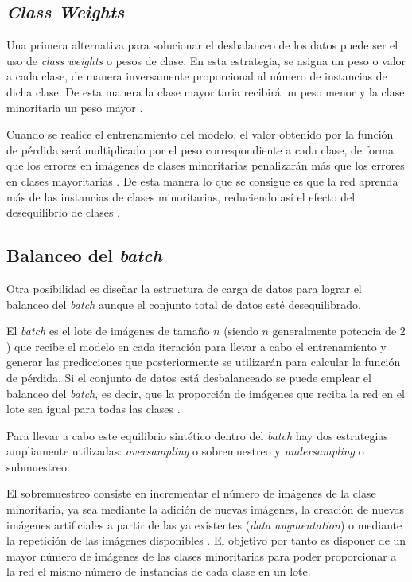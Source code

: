 \subsection{\textit{Class Weights}}

Una primera alternativa para solucionar el desbalanceo de los datos puede ser el uso de \textit{class weights} o pesos de clase. En esta estrategia, se asigna un peso o valor a cada clase, de manera inversamente proporcional al número de instancias de dicha clase. De esta manera la clase mayoritaria recibirá un peso menor y la clase minoritaria un peso mayor \cite{classw:scienced}. 

Cuando se realice el entrenamiento del modelo, el valor obtenido por la función de pérdida será multiplicado por el peso correspondiente a cada clase, de forma que los errores en imágenes de clases minoritarias penalizarán más que los errores en clases mayoritarias \cite{classw:book}. De esta manera lo que se consigue es que la red aprenda más de las instancias de clases minoritarias, reduciendo así el efecto del desequilibrio de clases \cite{classw:scienced}.

\subsection{Balanceo del \textit{batch}}

Otra posibilidad es diseñar la estructura de carga de datos para lograr el balanceo del \textit{batch} aunque el conjunto total de datos esté desequilibrado.

El \textit{batch} es el lote de imágenes de tamaño $n$ (siendo $n$ generalmente potencia de $2$) que recibe el modelo en cada iteración para llevar a cabo el entrenamiento y generar las predicciones que posteriormente se utilizarán para calcular la función de pérdida. Si el conjunto de datos está desbalanceado se puede emplear el balanceo del \textit{batch}, es decir, que la proporción de imágenes que reciba la red en el lote sea igual para todas las clases \cite{bal_batch:scihub}.

Para llevar a cabo este equilibrio sintético dentro del \textit{batch} hay dos estrategias ampliamente utilizadas: \textit{oversampling} o sobremuestreo y \textit{undersampling} o submuestreo.

El sobremuestreo consiste en incrementar el número de imágenes de la clase minoritaria, ya sea mediante la adición de nuevas imágenes, la creación de nuevas imágenes artificiales a partir de las ya existentes (\textit{data augmentation}) o mediante la repetición de las imágenes disponibles \cite{underover:ieee}. El objetivo por tanto es disponer de un mayor número de imágenes de las clases minoritarias para poder proporcionar a la red el mismo número de instancias de cada clase en un lote.


